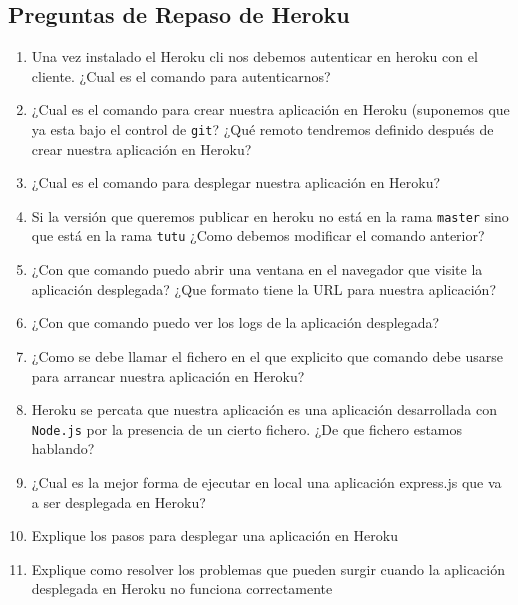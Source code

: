 \subsection{Preguntas de Repaso de
Heroku}\label{preguntas-de-repaso-de-heroku}

\begin{enumerate}
\def\labelenumi{\arabic{enumi}.}
\item
  Una vez instalado el Heroku cli nos debemos autenticar en heroku con
  el cliente. ¿Cual es el comando para autenticarnos?
\item
  ¿Cual es el comando para crear nuestra aplicación en Heroku (suponemos
  que ya esta bajo el control de \texttt{git}? ¿Qué remoto tendremos
  definido después de crear nuestra aplicación en Heroku?
\item
  ¿Cual es el comando para desplegar nuestra aplicación en Heroku?
\item
  Si la versión que queremos publicar en heroku no está en la rama
  \texttt{master} sino que está en la rama \texttt{tutu} ¿Como debemos
  modificar el comando anterior?
\item
  ¿Con que comando puedo abrir una ventana en el navegador que visite la
  aplicación desplegada? ¿Que formato tiene la URL para nuestra
  aplicación?
\item
  ¿Con que comando puedo ver los logs de la aplicación desplegada?
\item
  ¿Como se debe llamar el fichero en el que explicito que comando debe
  usarse para arrancar nuestra aplicación en Heroku?
\item
  Heroku se percata que nuestra aplicación es una aplicación
  desarrollada con \texttt{Node.js} por la presencia de un cierto
  fichero. ¿De que fichero estamos hablando?
\item
  ¿Cual es la mejor forma de ejecutar en local una aplicación express.js
  que va a ser desplegada en Heroku?
\item
  Explique los pasos para desplegar una aplicación en Heroku
\item
  Explique como resolver los problemas que pueden surgir cuando la
  aplicación desplegada en Heroku no funciona correctamente
\end{enumerate}
